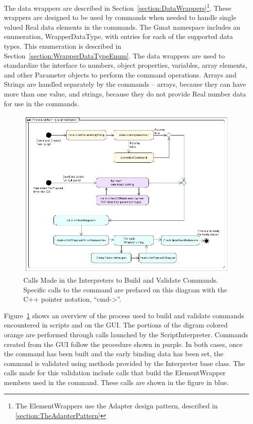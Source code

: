 The data wrappers are described in Section~\ref{section:DataWrappers}\footnote{The ElementWrappers
use the Adapter design pattern, described in \ref{section:TheAdapterPattern}}. These wrappers are
designed to be used by commands when needed to handle single valued Real data elements in the
commands.  The Gmat namespace includes an enumeration, WrapperDataType, with entries for each of the
supported data types.  This enumeration is described in Section~\ref{section:WrapperDataTypeEnum}.
The data wrappers are used to standardize the interface to numbers, object properties, variables,
array elements, and other Parameter objects to perform the command operations. Arrays and Strings
are handled separately by the commands -- arrays, because they can have more than one value, and
strings, because they do not provide Real number data for use in the commands.

\begin{figure}[htb]
\begin{center}
\includegraphics[412,315]{Images/CommandParsingandValidation.png}
\caption[Calls Made to Build and Validate Commands]{\label{figure:CommandParsingFlow}Calls Made in
the Interpreters to Build and Validate Commands.  Specific calls to the command are prefaced on this
diagram with the C++ pointer notation, ``cmd->''.}
\end{center}
\end{figure}

Figure~\ref{figure:CommandParsingFlow} shows an overview of the process used to build and validate
commands encountered in scripts and on the GUI.  The portions of the digram colored orange are
performed through calls launched by the ScriptInterpreter.  Commands created from the GUI follow the
procedure shown in purple.  In both cases, once the command has been built and the early binding
data has been set, the command is validated using methods provided by the Interpreter base class.
The calls made for this validation include calls that build the ElementWrapper members used in the
command.  These calls are shown in the figure in blue.

